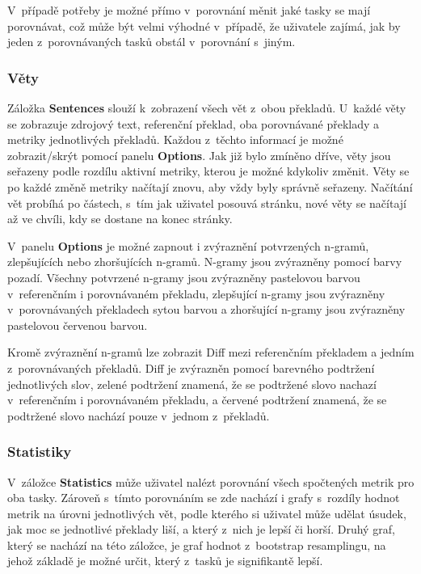 V~případě potřeby je možné přímo v~porovnání měnit jaké tasky se mají porovnávat,
  což může být velmi výhodné v~případě,
  že uživatele zajímá,
  jak by jeden z~porovnávaných tasků obstál v~porovnání s~jiným.

\subsubsection{Věty}
Záložka \textbf{Sentences} slouží k~zobrazení všech vět z~obou překladů.
U~každé věty se zobrazuje zdrojový text,
  referenční překlad, oba porovnávané překlady
  a metriky jednotlivých překladů.
Každou z~těchto informací je možné zobrazit/skrýt pomocí panelu \textbf{Options}.
Jak již bylo zmíněno dříve,
  věty jsou seřazeny podle rozdílu aktivní metriky,
  kterou je možné kdykoliv změnit.
Věty se po každé změně metriky načítají znovu,
  aby vždy byly správně seřazeny.
Načítání vět probíhá po částech,
  s~tím jak uživatel posouvá stránku,
  nové věty se načítají až ve chvíli,
  kdy se dostane na konec stránky.

V~panelu \textbf{Options} je možné zapnout i zvýraznění potvrzených \mbox{n-gramů}, zlepšujících nebo zhoršujících \mbox{n-gramů}.
N-gramy jsou zvýrazněny pomocí barvy pozadí.
Všechny potvrzené \mbox{n-gramy} jsou zvýrazněny pastelovou barvou v~referenčním i porovnávaném překladu,
  zlepšující \mbox{n-gramy} jsou zvýrazněny v~porovnávaných překladech sytou barvou
  a zhoršující \mbox{n-gramy} jsou zvýrazněny pastelovou červenou barvou.

Kromě zvýraznění \mbox{n-gramů} lze zobrazit Diff mezi referenčním překladem a jedním z~porovnávaných překladů.
Diff je zvýrazněn pomocí barevného podtržení jednotlivých slov,
  zelené podtržení znamená, že se podtržené slovo nachazí v~referenčním i porovnávaném překladu,
  a červené podtržení znamená, že se podtržené slovo nachází pouze v~jednom z~překladů.

\subsubsection{Statistiky}
V~záložce \textbf{Statistics} může uživatel nalézt porovnání všech spočtených metrik pro oba tasky.
Zároveň s~tímto porovnáním se zde nachází i grafy s~rozdíly hodnot metrik na úrovni jednotlivých vět,
  podle kterého si uživatel může udělat úsudek,
  jak moc se jednotlivé překlady liší,
  a který z~nich je lepší či horší.
Druhý graf, který se nachází na této záložce,
  je graf hodnot z~bootstrap resamplingu,
  na jehož základě je možné určit,
  který z~tasků je signifikantě lepší.

